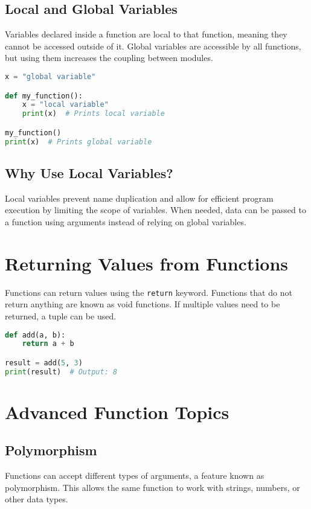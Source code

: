 \documentclass{article}
\begin{document}
\subsection{Local and Global Variables}
Variables declared inside a function are local to that function, meaning they cannot be accessed outside of it. Global variables are accessible by all functions, but using them increases the coupling between modules.

\begin{lstlisting}[language=Python, caption={Using Local and Global Variables}]
x = "global variable"

def my_function():
    x = "local variable"
    print(x)  # Prints local variable

my_function()
print(x)  # Prints global variable
\end{lstlisting}

\subsection{Why Use Local Variables?}
Local variables prevent name duplication and allow for efficient program execution by limiting the scope of variables. When needed, data can be passed to a function using arguments instead of relying on global variables.

\section{Returning Values from Functions}

Functions can return values using the \lstinline|return| keyword. Functions that do not return anything are known as void functions. If multiple values need to be returned, a tuple can be used.

\begin{lstlisting}[language=Python, caption={Returning Values from a Function}]
def add(a, b):
    return a + b

result = add(5, 3)
print(result)  # Output: 8
\end{lstlisting}

\section{Advanced Function Topics}

\subsection{Polymorphism}
Functions can accept different types of arguments, a feature known as polymorphism. This allows the same function to work with strings, numbers, or other data types.
\end{document}
